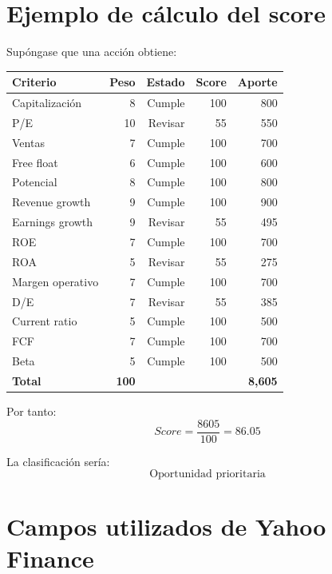 \documentclass[11pt,a4paper]{article}
\begin{document}
\section{Ejemplo de cálculo del score}

Supóngase que una acción obtiene:

\begin{center}
\begin{tabular}{lrrrr}
\toprule
\textbf{Criterio} & \textbf{Peso} & \textbf{Estado} & \textbf{Score} & \textbf{Aporte}\\
\midrule
Capitalización & 8 & Cumple & 100 & 800\\
P/E & 10 & Revisar & 55 & 550\\
Ventas & 7 & Cumple & 100 & 700\\
Free float & 6 & Cumple & 100 & 600\\
Potencial & 8 & Cumple & 100 & 800\\
Revenue growth & 9 & Cumple & 100 & 900\\
Earnings growth & 9 & Revisar & 55 & 495\\
ROE & 7 & Cumple & 100 & 700\\
ROA & 5 & Revisar & 55 & 275\\
Margen operativo & 7 & Cumple & 100 & 700\\
D/E & 7 & Revisar & 55 & 385\\
Current ratio & 5 & Cumple & 100 & 500\\
FCF & 7 & Cumple & 100 & 700\\
Beta & 5 & Cumple & 100 & 500\\
\midrule
\textbf{Total} & \textbf{100} & & & \textbf{8,605}\\
\bottomrule
\end{tabular}
\end{center}

Por tanto:
\[
Score=\frac{8605}{100}=86.05
\]

La clasificación sería:
\[
\boxed{\text{Oportunidad prioritaria}}
\]

\section{Campos utilizados de Yahoo Finance}
\end{document}
